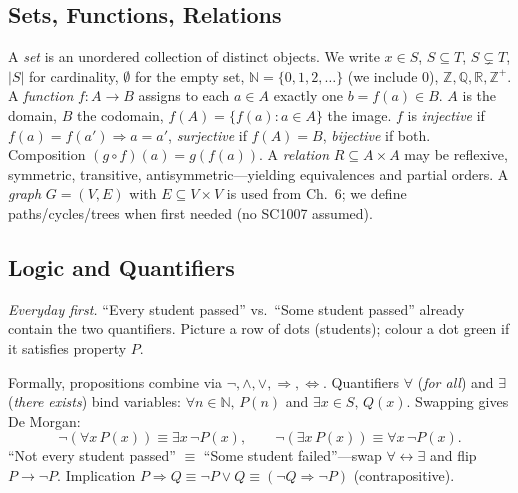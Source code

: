 \subsection{Sets, Functions, Relations}
A \emph{set} is an unordered collection of distinct objects. We write $x\in S$, $S\subseteq T$, $S\subsetneq T$, $|S|$ for cardinality, $\emptyset$ for the empty set, $\mathbb{N}=\{0,1,2,\dots\}$ (we include $0$), $\mathbb{Z},\mathbb{Q},\mathbb{R},\mathbb{Z}^+$.
A \emph{function} $f:A\to B$ assigns to each $a\in A$ exactly one $b=f(a)\in B$. $A$ is the domain, $B$ the codomain, $f(A)=\{f(a):a\in A\}$ the image. $f$ is \emph{injective} if $f(a)=f(a')\Rightarrow a=a'$, \emph{surjective} if $f(A)=B$, \emph{bijective} if both. Composition $(g\circ f)(a)=g(f(a))$.
A \emph{relation} $R\subseteq A\times A$ may be reflexive, symmetric, transitive, antisymmetric---yielding equivalences and partial orders. A \emph{graph} $G=(V,E)$ with $E\subseteq V\times V$ is used from Ch.~6; we define paths/cycles/trees when first needed (no SC1007 assumed).

\subsection{Logic and Quantifiers}
\emph{Everyday first.} ``Every student passed'' vs.\ ``Some student passed'' already contain the two quantifiers. Picture a row of dots (students); colour a dot green if it satisfies property $P$.
\begin{center}
\end{center}
Formally, propositions combine via $\neg,\land,\lor,\Rightarrow,\Leftrightarrow$. Quantifiers $\forall$ (\emph{for all}) and $\exists$ (\emph{there exists}) bind variables: $\forall n\in\mathbb{N},\,P(n)$ and $\exists x\in S,\,Q(x)$. Swapping gives De Morgan:
\[
\neg(\forall x\,P(x))\equiv\exists x\,\neg P(x),\qquad
\neg(\exists x\,P(x))\equiv\forall x\,\neg P(x).
\]
``Not every student passed'' $\equiv$ ``Some student failed''---swap $\forall\leftrightarrow\exists$ and flip $P\to\neg P$. Implication $P\Rightarrow Q\equiv\neg P\lor Q\equiv(\neg Q\Rightarrow\neg P)$ (contrapositive).

